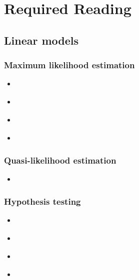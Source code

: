 \documentclass{report}
\begin{document}
\renewcommand\listoflistingscaption{List of Code Examples}
\listoftables
\begingroup
\let\clearpage\relax
\listofalgorithms
\listoflistings 
\endgroup

\chapter{Required Reading} \label{chap:required-reading}

\section{Linear models}\label{sec:reading-ols}

\subsection{Maximum likelihood estimation}

\begin{itemize}
    \item \cite[Chapter~2]{faraway_linear_2015} 
    \item \cite[Chapter~2]{wakefield_bayesian_2013}
    \item \cite[Chapter~2.1]{agresti_foundations_2015}
    \item \cite[Chapter~2]{dunn_generalized_2018}
\end{itemize}

\subsection{Quasi-likelihood estimation}

\begin{itemize}
    \item \cite[Chapter~2.5]{wakefield_bayesian_2013}
\end{itemize}

\subsection{Hypothesis testing}

\begin{itemize}
    \item \cite[Chapter~3]{faraway_linear_2015}
    \item \cite[Chapter~2.9]{wakefield_bayesian_2013}
    \item \cite[Chapter~3.2]{agresti_foundations_2015}
    \item \cite[Chapter~2.8]{dunn_generalized_2018}
\end{itemize}
\end{document}

